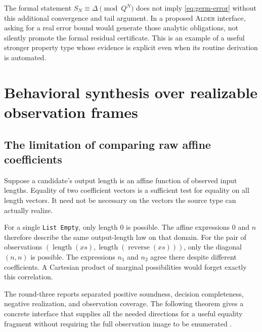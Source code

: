 \documentclass[11pt,a4paper]{article}
\newcommand{\code}[1]{\nolinkurl{#1}}
\newcommand{\Alder}{\textsc{Alder}}
\theoremstyle{plain}
\theoremstyle{definition}
\theoremstyle{remark}
\begin{document}
The formal statement $S_N\equiv\Delta\pmod{Q^N}$ does not imply \eqref{eq:germ-error} without this additional convergence and tail argument. In a proposed \Alder{} interface, asking for a real error bound would generate those analytic obligations, not silently promote the formal residual certificate. This is an example of a useful stronger property type whose evidence is explicit even when its routine derivation is automated.

\section{Behavioral synthesis over realizable observation frames}\label{sec:frames}

\subsection{The limitation of comparing raw affine coefficients}
Suppose a candidate's output length is an affine function of observed input lengths. Equality of two coefficient vectors is a sufficient test for equality on all length vectors. It need not be necessary on the vectors the source type can actually realize.

For a single \code{List Empty}, only length $0$ is possible. The affine expressions $0$ and $n$ therefore describe the same output-length law on that domain. For the pair of observations $(\operatorname{length}(xs),\operatorname{length}(\operatorname{reverse}(xs)))$, only the diagonal $(n,n)$ is possible. The expressions $n_1$ and $n_2$ agree there despite different coefficients. A Cartesian product of marginal possibilities would forget exactly this correlation.

The round-three reports separated positive soundness, decision completeness, negative realization, and observation coverage. The following theorem gives a concrete interface that supplies all the needed directions for a useful equality fragment without requiring the full observation image to be enumerated \cite{r3a,r3b}.
\end{document}
